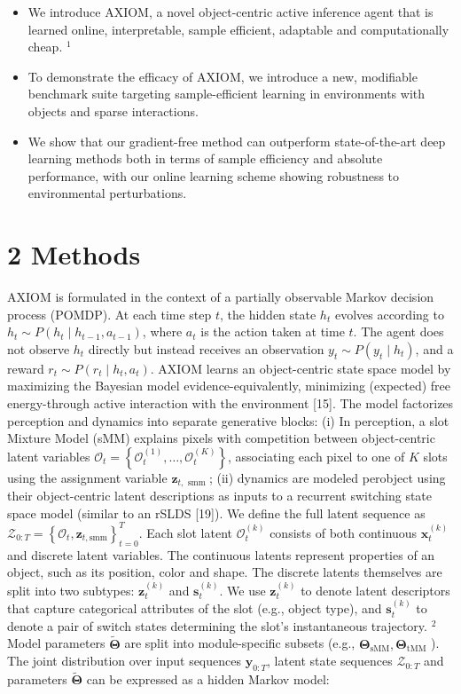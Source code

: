 \documentclass[10pt]{article}
\begin{document}
\begin{itemize}
  \item We introduce AXIOM, a novel object-centric active inference agent that is learned online, interpretable, sample efficient, adaptable and computationally cheap. ${ }^{1}$
  \item To demonstrate the efficacy of AXIOM, we introduce a new, modifiable benchmark suite targeting sample-efficient learning in environments with objects and sparse interactions.
  \item We show that our gradient-free method can outperform state-of-the-art deep learning methods both in terms of sample efficiency and absolute performance, with our online learning scheme showing robustness to environmental perturbations.
\end{itemize}

\section*{2 Methods}
AXIOM is formulated in the context of a partially observable Markov decision process (POMDP). At each time step $t$, the hidden state $h_{t}$ evolves according to $h_{t} \sim P\left(h_{t} \mid h_{t-1}, a_{t-1}\right)$, where $a_{t}$ is the action taken at time $t$. The agent does not observe $h_{t}$ directly but instead receives an observation $y_{t} \sim P\left(y_{t} \mid h_{t}\right)$, and a reward $r_{t} \sim P\left(r_{t} \mid h_{t}, a_{t}\right)$. AXIOM learns an object-centric state space model by maximizing the Bayesian model evidence-equivalently, minimizing (expected) free energy-through active interaction with the environment [15]. The model factorizes perception and dynamics into separate generative blocks: (i) In perception, a slot Mixture Model (sMM) explains pixels with competition between object-centric latent variables $\mathcal{O}_{t}=\left\{\mathcal{O}_{t}^{(1)}, \ldots, \mathcal{O}_{t}^{(K)}\right\}$, associating each pixel to one of $K$ slots using the assignment variable $\mathbf{z}_{t, \text { smm }}$; (ii) dynamics are modeled perobject using their object-centric latent descriptions as inputs to a recurrent switching state space model (similar to an rSLDS [19]). We define the full latent sequence as $\mathcal{Z}_{0: T}=\left\{\mathcal{O}_{t}, \mathbf{z}_{t, \mathrm{smm}}\right\}_{t=0}^{T}$. Each slot latent $\mathcal{O}_{t}^{(k)}$ consists of both continuous $\mathbf{x}_{t}^{(k)}$ and discrete latent variables. The continuous latents represent properties of an object, such as its position, color and shape. The discrete latents themselves are split into two subtypes: $\mathbf{z}_{t}^{(k)}$ and $\mathbf{s}_{t}^{(k)}$. We use $\mathbf{z}_{t}^{(k)}$ to denote latent descriptors that capture categorical attributes of the slot (e.g., object type), and $\mathbf{s}_{t}^{(k)}$ to denote a pair of switch states determining the slot's instantaneous trajectory. ${ }^{2}$ Model parameters $\tilde{\boldsymbol{\Theta}}$ are split into module-specific subsets (e.g., $\boldsymbol{\Theta}_{\mathrm{sMM}}, \boldsymbol{\Theta}_{\mathrm{tMM}}$ ). The joint distribution over input sequences $\mathbf{y}_{0: T}$, latent state sequences $\mathcal{Z}_{0: T}$ and parameters $\tilde{\boldsymbol{\Theta}}$ can be expressed as a hidden Markov model:
\end{document}
